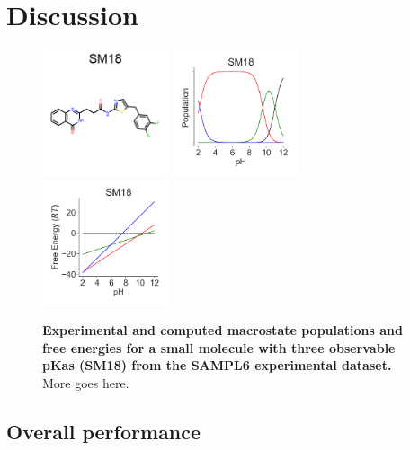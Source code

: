 \documentclass[9pt,lineno]{elife}
\begin{document}
\section{Discussion}

\begin{figure}[H]
    \centering
    \includegraphics[width=0.33\textwidth]{Images/Molecules/SM18.png}
    \includegraphics[width=0.33\textwidth]{Images/Experiment/SM18/population-curve.png}
    \includegraphics[width=0.33\textwidth]{Images/Experiment/SM18/free-energy-curve.png}
    \caption{{\bf Experimental and computed macrostate populations and free energies for a small molecule with three observable pKas (SM18) from the SAMPL6 experimental dataset.}
    More goes here.
    \label{fig:titrationcurve}}
\end{figure}

\subsection{Overall performance}
\end{document}
